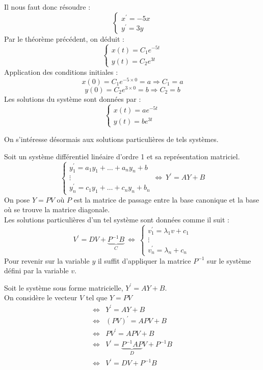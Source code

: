 \begin{ex}
Il nous faut donc résoudre :
$$\begin{cases}
x^{\prime}=-5x\\
y^{\prime}=3y
\end{cases}$$
Par le théorème précédent, on déduit :
$$\begin{cases}
x(t)=C_1 e^{-5t}\\
y(t)=C_2 e^{3t}
\end{cases}$$
Application des conditions initiales :
$$x(0)=C_1 e^{-5\times0}=a \Rightarrow C_1=a$$
$$y(0)=C_2 e^{3\times 0}=b \Rightarrow C_2=b$$
Les solutions du système sont données par :
$$\begin{cases}
x(t)=ae^{-5t}\\
y(t)=be^{3t}
\end{cases}$$
\end{ex}
On s'intéresse désormais aux solutions particulières de tels systèmes.
\begin{thm}[Théorème]
Soit un système différentiel linéaire d'ordre 1 et sa représentation matriciel.
$$
\begin{cases}
y_1^{\prime}=a_1 y_1 +\hdots+a_n y_n + b\\
\vdots\\
y_{n}^{\prime}=c_1 y_1 +\hdots+c_n y_n + b_n
\end{cases}\Leftrightarrow\ Y^{\prime}=AY+B$$
On pose $Y=PV$ où $P$ est la matrice de passage entre la base canonique et la base où se trouve la matrice diagonale.\\
Les solutions particulières d'un tel système sont données comme il suit :
$$V^{\prime}=DV+\underbrace{P^{-1}B}_{C}\ \Leftrightarrow\ 
\begin{cases}
v_1^{\prime}=\lambda_1 v+c_1\\
\vdots\\
v_{n}^{\prime}=\lambda_n +c_n
\end{cases}$$
Pour revenir sur la variable $y$ il suffit d'appliquer la matrice $P^{-1}$ sur le système défini par la variable $v$.
\end{thm}
\begin{demo}
Soit le système sous forme matricielle, $Y^{\prime}=AY+B$.\\
On considère le vecteur $V$ tel que $Y=PV$
\begin{align*}
    \Leftrightarrow & Y^{\prime}=AY+B\\
    \Leftrightarrow & (PV)^{\prime}=APV+B\\
    \Leftrightarrow & PV^{\prime}=APV+B\\
    \Leftrightarrow & V^{\prime}=\underbrace{P^{-1}AP}_{D}V+P^{-1}B\\
    \Leftrightarrow & V^{\prime}=DV+P^{-1}B
\end{align*}
\end{demo}
